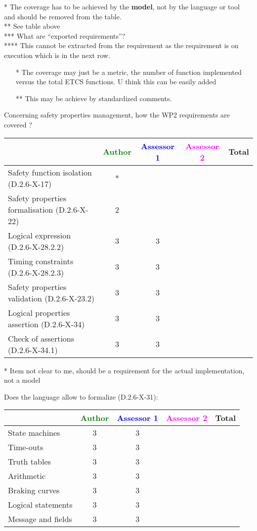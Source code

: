 \begin{author_comment}
* The coverage has to be achieved by the \textbf{model}, not by the language or tool and should be removed from the table.\\
** See table above\\
*** What are ``exported requirements''?\\
**** This cannot be extracted from the requirement as the requirement is on execution which is in the next row.
\end{author_comment}
\begin{assessor1}
\begin{itemize}
\item[*] The coverage may just be a metric, the number of function
  implemented versus the total ETCS functions. U think this can be
  easily added
\item[**] This may be achieve by standardized comments.
\end{itemize}
\end{assessor1}
Concerning safety properties management, how the WP2 requirements are covered ?

\begin{tabular}{|l | c | c | c | c|}
\hline
& \textcolor{green}{Author} & \textcolor{blue}{Assessor 1} & \textcolor{magenta}{Assessor 2} & Total \\
\hline
Safety function isolation (D.2.6-X-17) &* & & & \\
\hline
Safety properties formalisation (D.2.6-X-22) &2 & & & \\
\hline
Logical expression (D.2.6-X-28.2.2) &3 &3 & & \\
\hline
Timing constraints (D.2.6-X-28.2.3) &3 &3 & & \\
\hline
Safety properties validation (D.2.6-X-23.2) &3 &3 & & \\
\hline
Logical properties assertion (D.2.6-X-34) &3 &3 & & \\
\hline
Check of assertions (D.2.6-X-34.1) &3 &3 & & \\
\hline
\end{tabular}

\begin{author_comment}
* Item not clear to me, should be a requirement for the actual implementation, not a model
\end{author_comment}

Does the language allow to formalize (D.2.6-X-31):

\begin{tabular}{|l | c | c | c | c|}
\hline
& \textcolor{green}{Author} & \textcolor{blue}{Assessor 1} & \textcolor{magenta}{Assessor 2} & Total \\
\hline
State machines &3 &3 & & \\
\hline
Time-outs &3 &3 & & \\
\hline
Truth tables &3 &3 & & \\
\hline
Arithmetic &3 &3 & & \\
\hline
Braking curves &3 &3 & & \\
\hline
Logical statements &3 &3 & & \\
\hline
Message and fields &3 &3 & & \\
\hline
\end{tabular}

